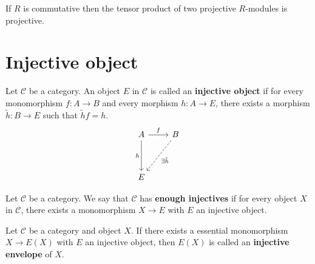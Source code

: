 \documentclass[12pt, oneside]{book}
\begin{document}
\begin{proposition}
    If $R$ is commutative then the tensor product of two projective $R$-modules is projective.
\end{proposition}













\section{Injective object} %
\begin{definition}
    Let $\mathcal{C}$ be a category.
    An object $E$ in $\mathcal{C}$ is called an \textbf{injective object} if for every monomorphism $f:A\rightarrow B$ and every morphism $h:A\rightarrow E$, there exists a morphism $\tilde{h}:B\rightarrow E$ such that $\tilde{h}f=h$.
    \begin{equation*}
        \begin{tikzcd}
            A \arrow[dd,"h"']\arrow[r,"f"] & B \arrow[ldd,dashed, "\exists \tilde{h}"]  \\
            &  \\
            E &
        \end{tikzcd}
    \end{equation*}
\end{definition}
\begin{definition}
    Let $\mathcal{C}$ be a category. We say that $\mathcal{C}$ has \textbf{enough injectives} if for every object $X$ in $\mathcal{C}$, there exists a monomorphism $X \rightarrow E$ with $E$ an injective object.
\end{definition}
\begin{definition}
    Let $\mathcal{C}$ be a category and object $X$.
    If there exists a essential monomorphism $X \rightarrow E\left(X\right)$ with $E$ an injective object, then $E\left(X\right)$ is called an \textbf{injective envelope} of $X$.
\end{definition}
\end{document}
